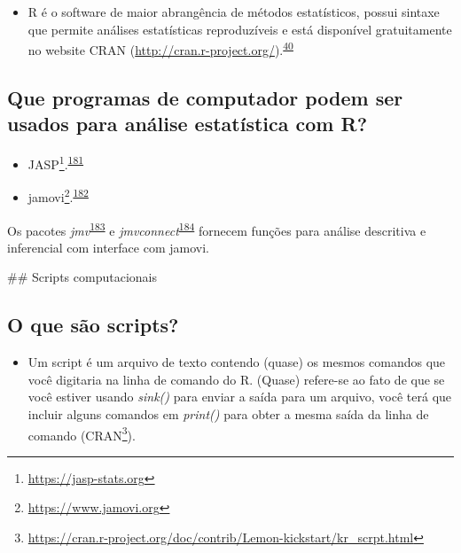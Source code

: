\documentclass[
  a4paper,
]{book}
\providecommand{\tightlist}{%
  \setlength{\itemsep}{0pt}\setlength{\parskip}{0pt}}
\renewcommand{\href}[2]{#2\footnote{\url{#1}}}
\newenvironment{infobox}[1]
  {
  \begin{itemize}
  \renewcommand{\labelitemi}{
    \raisebox{-.7\height}[0pt][0pt]{
      {\setkeys{Gin}{width=3em,keepaspectratio}
        \texttt{[image: \#1]}}
    }
  }
  \setlength{\fboxsep}{1em}
  \begin{blackbox}
  \item
  }
  {
  \end{blackbox}
  \end{itemize}
  }
\begin{document}
\begin{itemize}
\tightlist
\item
  R é o software de maior abrangência de métodos estatísticos, possui sintaxe que permite análises estatísticas reproduzíveis e está disponível gratuitamente no website CRAN (\url{http://cran.r-project.org/}).\textsuperscript{\protect\hyperlink{ref-mair2016}{40}}
\end{itemize}

\hypertarget{que-programas-de-computador-podem-ser-usados-para-anuxe1lise-estatuxedstica-com-r}{%
\subsection{Que programas de computador podem ser usados para análise estatística com R?}\label{que-programas-de-computador-podem-ser-usados-para-anuxe1lise-estatuxedstica-com-r}}

\begin{itemize}
\item
  \href{https://jasp-stats.org}{JASP}.\textsuperscript{\protect\hyperlink{ref-love2019}{181}}
\item
  \href{https://www.jamovi.org}{jamovi}.\textsuperscript{\protect\hyperlink{ref-sahin2020}{182}}
\end{itemize}

\begin{infobox}{images/Rlogo}
Os pacotes \emph{jmv}\textsuperscript{\protect\hyperlink{ref-jmv}{183}} e \emph{jmvconnect}\textsuperscript{\protect\hyperlink{ref-jmvconnect}{184}} fornecem funções para análise descritiva e inferencial com interface com jamovi.

\end{infobox}

\#\# Scripts computacionais

\hypertarget{o-que-suxe3o-scripts}{%
\subsection{O que são scripts?}\label{o-que-suxe3o-scripts}}

\begin{itemize}
\tightlist
\item
  Um script é um arquivo de texto contendo (quase) os mesmos comandos que você digitaria na linha de comando do R. (Quase) refere-se ao fato de que se você estiver usando \emph{sink()} para enviar a saída para um arquivo, você terá que incluir alguns comandos em \emph{print()} para obter a mesma saída da linha de comando (\href{https://cran.r-project.org/doc/contrib/Lemon-kickstart/kr_scrpt.html}{CRAN}).
\end{itemize}
\end{document}
